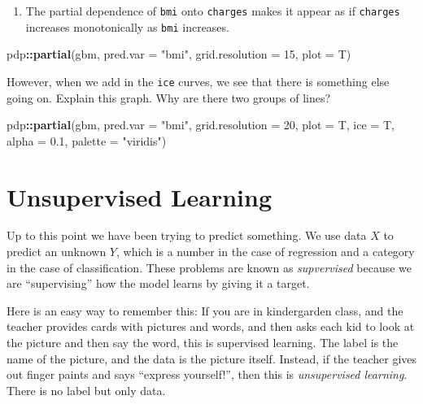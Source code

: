 \documentclass[openany]{book}
\newenvironment{Shaded}{\begin{snugshade}}{\end{snugshade}}
\newcommand{\DataTypeTok}[1]{\textcolor[rgb]{0.13,0.29,0.53}{#1}}
\newcommand{\DecValTok}[1]{\textcolor[rgb]{0.00,0.00,0.81}{#1}}
\newcommand{\FloatTok}[1]{\textcolor[rgb]{0.00,0.00,0.81}{#1}}
\newcommand{\KeywordTok}[1]{\textcolor[rgb]{0.13,0.29,0.53}{\textbf{#1}}}
\newcommand{\NormalTok}[1]{#1}
\newcommand{\OperatorTok}[1]{\textcolor[rgb]{0.81,0.36,0.00}{\textbf{#1}}}
\newcommand{\StringTok}[1]{\textcolor[rgb]{0.31,0.60,0.02}{#1}}
\providecommand{\tightlist}{%
  \setlength{\itemsep}{0pt}\setlength{\parskip}{0pt}}
\begin{document}
\begin{enumerate}
\def\labelenumi{\arabic{enumi}.}
\setcounter{enumi}{2}
\tightlist
\item
  The partial dependence of \texttt{bmi} onto \texttt{charges} makes it appear as if \texttt{charges} increases monotonically as \texttt{bmi} increases.
\end{enumerate}

\begin{Shaded}
\begin{Highlighting}[]
\NormalTok{pdp}\OperatorTok{::}\KeywordTok{partial}\NormalTok{(gbm, }\DataTypeTok{pred.var =} \StringTok{"bmi"}\NormalTok{, }\DataTypeTok{grid.resolution =} \DecValTok{15}\NormalTok{, }\DataTypeTok{plot =}\NormalTok{ T)}
\end{Highlighting}
\end{Shaded}

However, when we add in the \texttt{ice} curves, we see that there is something else going on. Explain this graph. Why are there two groups of lines?

\begin{Shaded}
\begin{Highlighting}[]
\NormalTok{pdp}\OperatorTok{::}\KeywordTok{partial}\NormalTok{(gbm, }\DataTypeTok{pred.var =} \StringTok{"bmi"}\NormalTok{, }\DataTypeTok{grid.resolution =} \DecValTok{20}\NormalTok{, }\DataTypeTok{plot =}\NormalTok{ T, }\DataTypeTok{ice =}\NormalTok{ T, }\DataTypeTok{alpha =} \FloatTok{0.1}\NormalTok{, }\DataTypeTok{palette =} \StringTok{"viridis"}\NormalTok{)}
\end{Highlighting}
\end{Shaded}

\hypertarget{unsupervised-learning}{%
\chapter{Unsupervised Learning}\label{unsupervised-learning}}

Up to this point we have been trying to predict something. We use data \(X\) to predict an unknown \(Y\), which is a number in the case of regression and a category in the case of classification. These problems are known as \emph{supvervised} because we are ``supervising'' how the model learns by giving it a target.

Here is an easy way to remember this: If you are in kindergarden class, and the teacher provides cards with pictures and words, and then asks each kid to look at the picture and then say the word, this is supervised learning. The label is the name of the picture, and the data is the picture itself. Instead, if the teacher gives out finger paints and says ``express yourself!'', then this is \emph{unsupervised learning}. There is no label but only data.
\end{document}
